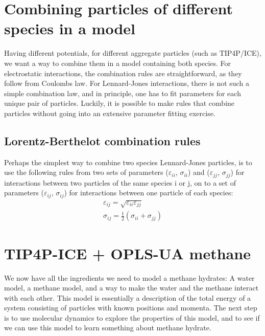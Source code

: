 \section{Combining particles of different species in a model}
Having different potentials, for different aggregate particles (such as TIP4P/ICE), we want a way to combine them in a model containing both species. For electrostatic interactions, the combination rules are straightforward, as they follow from Coulombs law. For Lennard-Jones interactions, there is not such a simple combination law, and in principle, one has to fit parameters for each unique pair of particles. Luckily, it is possible to make rules that combine particles without going into an extensive parameter fitting exercise. 

\subsection{Lorentz-Berthelot combination rules}
Perhaps the simplest way to combine two species Lennard-Jones particles, is to use the following rules from two sets of parameters ($\varepsilon_{ii}$, $\sigma_{ii}$) and ($\varepsilon_{jj}$, $\sigma_{jj}$) for interactions between two particles of the same species i or j, on to a set of parameters ($\varepsilon_{ij}$, $\sigma_{ij}$) for interactions between one particle of each species:
\begin{align}
\varepsilon_{ij} = \sqrt{\varepsilon_{ii}\varepsilon_{jj}} \\
\sigma_{ij} = \frac{1}{2} \left(\sigma_{ii}+\sigma_{jj}\right)
\end{align}

\section{TIP4P-ICE + OPLS-UA methane}
We now have all the ingredients we need to model a methane hydrates: A water model, a methane model, and a way to make the water and the methane interact with each other. This model is essentially a description of the total energy of a system consisting of particles with known positions and momenta. The next step is to use molecular dynamics to explore the properties of this model, and to see if we can use this model to learn something about methane hydrate.

